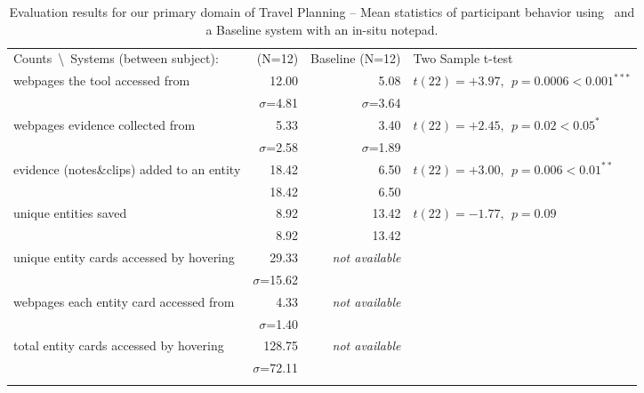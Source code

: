 

\begin{table*}
  \centering
  \small
  \begin{tabular}{p{}  r r l}
  
	
	Counts~\textbackslash~Systems (between subject): &
	{\SYSTEM} {\scriptsize(N=12)} &
	Baseline {\scriptsize(N=12)} & 
	Two Sample t-test
	\\
	
	\arrayrulecolor{black}\hline
	
	webpages the tool accessed from &
    12.00 &
    5.08 &
    $t(22)=+3.97,~~p=0.0006 < 0.001^{***}$
    \\
	&
    $\sigma$=4.81 &
    $\sigma$=3.64 &
    \\
    
	\arrayrulecolor{mygray}\hline
    
	webpages evidence collected from &
    5.33 &
    3.40 &
    $t(22)=+2.45,~~p=0.02 < 0.05^{*}$\\
	&
    $\sigma$=2.58 &
    $\sigma$=1.89 &
    \\
    
    \hline
    
	evidence (notes{\&}clips) added to an entity &
    18.42 &
    6.50 &
    $t(22)=+3.00,~~p=0.006 < 0.01^{**}$
    \\
	&
    18.42 &
    6.50 &
    \\
    
    \hline

	unique entities saved &
    8.92  &
    13.42 &
    $t(22)=-1.77,~~p=0.09$
    \\
	&
    8.92  &
    13.42 &
    \\
    
    \hline
    
	unique entity cards accessed by hovering &
    29.33 &
    \textit{not available} &
    \\
	&
    $\sigma$=15.62 & &
    \\
    
    \hline
    
	webpages each entity card accessed from &
    4.33 &
    \textit{not available} &
    \\
	&
    $\sigma$=1.40 &
    &
    \\
    
    \hline
    
	total entity cards accessed by hovering &
    128.75 &
    \textit{not available} &
    \\
	&
    $\sigma$=72.11 &
    &
    \\
	
	\arrayrulecolor{black}\hline
	
  \end{tabular}
  \caption{Evaluation results for our primary domain of Travel Planning -- Mean statistics of participant behavior using \SYSTEM~and a Baseline system with an in-situ notepad.}
  \label{tab:results_main}
\end{table*}